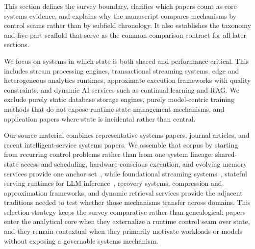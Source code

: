 \documentclass[acmsmall,screen,review]{acmart}
\begin{document}
This section defines the survey boundary, clarifies which papers count as core systems evidence, and explains why the manuscript compares mechanisms by control seams rather than by subfield chronology. It also establishes the taxonomy and five-part scaffold that serve as the common comparison contract for all later sections.

We focus on systems in which state is both shared and performance-critical. This includes stream processing engines, transactional streaming systems, edge and heterogeneous analytics runtimes, approximate execution frameworks with quality constraints, and dynamic AI services such as continual learning and RAG. We exclude purely static database storage engines, purely model-centric training methods that do not expose runtime state-management mechanisms, and application papers where state is incidental rather than central.

Our source material combines representative systems papers, journal articles, and recent intelligent-service systems papers. We assemble that corpus by starting from recurring control problems rather than from one system lineage: shared-state access and scheduling, hardware-conscious execution, and evolving memory services provide one anchor set~\cite{zhang2024survey,zhang2020hardware,mao2023morphstream,wu2023sentistream,zhang2026flowrag}, while foundational streaming systems~\cite{akidau2013millwheel,murray2013naiad,zaharia2013dstreams,akidau2015dataflow}, stateful serving runtimes for LLM inference~\cite{kwon2023pagedattention,agrawal2024sarathi,zheng2023sglang}, recovery systems, compression and approximation frameworks, and dynamic retrieval services provide the adjacent traditions needed to test whether those mechanisms transfer across domains. This selection strategy keeps the survey comparative rather than genealogical: papers enter the analytical core when they externalize a runtime control seam over state, and they remain contextual when they primarily motivate workloads or models without exposing a governable systems mechanism.
\end{document}

